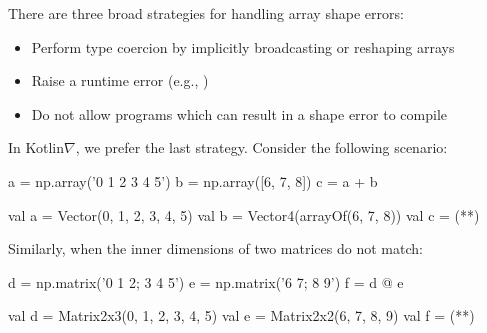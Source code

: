 \documentclass[portrait,a0b,final,a4resizeable]{a0poster}
\begin{document}
\begin{poster}
\begin{multicols}{2}
\begin{minipage}[c]{0.85\columnwidth}
      There are three broad strategies for handling array shape errors:
      \begin{itemize}[leftmargin=1in]
        \item Perform type coercion by implicitly broadcasting or reshaping arrays
        \item Raise a runtime error (e.g., )
        \item Do not allow programs which can result in a shape error to compile
      \end{itemize}

      In Kotlin$\nabla$, we prefer the last strategy. Consider the following scenario:
      \end{minipage}

\null\hspace*{2cm}\begin{minipage}[c]{0.40\columnwidth}
\begin{pythonlisting}
a = np.array('0 1 2 3 4 5')
b = np.array([6, 7, 8])
c = a + b
\end{pythonlisting}
\end{minipage}
\null\hspace*{2cm}\begin{minipage}[c]{0.45\columnwidth}
\begin{kotlinlisting}
val a = Vector(0, 1, 2, 3, 4, 5)
val b = Vector4(arrayOf(6, 7, 8))
val c = (**)
\end{kotlinlisting}
\end{minipage}

\null\hspace*{3cm}\begin{minipage}[c]{0.85\columnwidth}
Similarly, when the inner dimensions of two matrices do not match:
\end{minipage}

\vspace*{-1cm}
\null\hspace*{2cm}\begin{minipage}[c]{0.40\columnwidth}
\begin{pythonlisting}
d = np.matrix('0 1 2; 3 4 5')
e = np.matrix('6 7; 8 9')
f = d @ e
                          \end{pythonlisting}
      \end{minipage}
      \null\hspace*{2cm}\begin{minipage}[c]{0.42\columnwidth}
                          \begin{kotlinlisting}
val d = Matrix2x3(0, 1, 2, 3, 4, 5)
val e = Matrix2x2(6, 7, 8, 9)
val f = (**)
                          \end{kotlinlisting}
      \end{minipage}


\end{multicols}
\end{poster}
\end{document}
